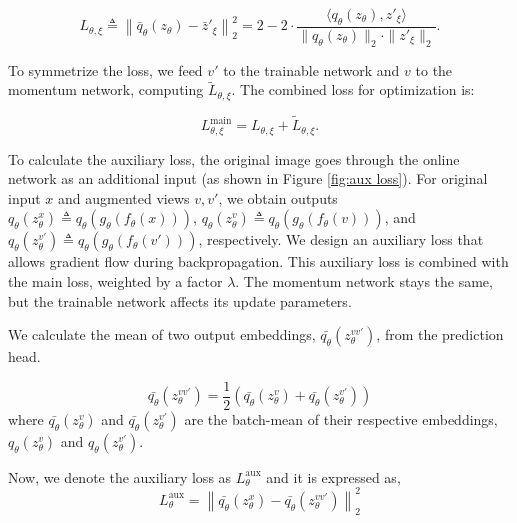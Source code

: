 \begin{equation} \label{eq:loss}
L_{\theta, \xi} \triangleq \left\| \bar{q}_{\theta}(z_{\theta}) - \bar{z}'_{\xi} \right\|_{2}^{2} = 2 - 2 \cdot \frac{\langle q_{\theta}(z_{\theta}), z'_{\xi} \rangle}{\| q_{\theta}(z_{\theta}) \|_{2} \cdot \| z'_{\xi} \|_{2}}.
\end{equation}

To symmetrize the loss, we feed $v'$ to the trainable network and $v$ to the momentum network, computing $\tilde{L}_{\theta, \xi}$. The combined loss for optimization is:

\begin{equation}
L_{\theta, \xi}^{\text{main}} = L_{\theta, \xi} + \tilde{L}_{\theta, \xi}.
\end{equation}

To calculate the auxiliary loss, the original image goes through the online network as an additional input (as shown in Figure \ref{fig:aux loss}). For original input $x$ and augmented views $v, v'$, we obtain outputs $q_{\theta}(z_{\theta }^{x})\triangleq q_{\theta}(g_{\theta}(f_{\theta}(x)))$, $q_{\theta}(z_{\theta }^{v})\triangleq q_{\theta}(g_{\theta}(f_{\theta}(v)))$, and $q_{\theta}(z_{\theta }^{v'})\triangleq q_{\theta}(g_{\theta}(f_{\theta}(v')))$, respectively. We design an auxiliary loss that allows gradient flow during backpropagation. This auxiliary loss is combined with the main loss, weighted by a factor \(\lambda\). The momentum network stays the same, but the trainable network affects its update parameters.

We calculate the mean of two output embeddings, $\bar{q_{\theta}}(z_{\theta }^{vv'})$, from the prediction head.

\begin{equation}
\bar{q_{\theta}}(z_{\theta }^{vv'}) =  \frac{1}{2}\left ( \bar{q_{\theta}}(z_{\theta}^{v}) + \bar{q_{\theta}}(z_{\theta}^{v'}) \right )
\end{equation}
where $\bar{q_{\theta}}(z_{\theta}^{v})$ and $\bar{q_{\theta}}(z_{\theta}^{v'})$ are the batch-mean of their respective embeddings, $q_{\theta}(z_{\theta}^{v})$ and $q_{\theta}(z_{\theta}^{v'})$.

Now, we denote the auxiliary loss as $L_{\theta}^{\text{aux}}$ and it is expressed as,
\begin{equation}
L_{\theta}^{\text{aux}} = \left \| \bar{q_{\theta}}(z_{\theta}^{x}) - \bar{q_{\theta}}(z_{\theta}^{vv'})\right \|_{2}^{2}
\end{equation}

